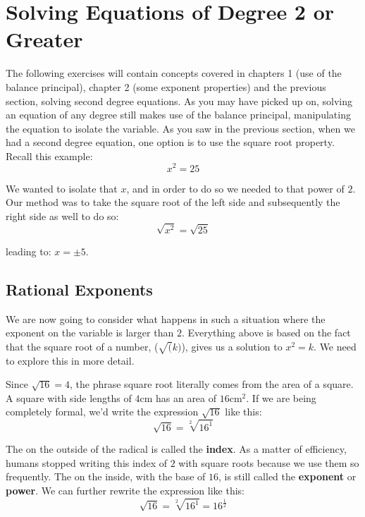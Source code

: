 %
%

\section{Solving Equations of Degree 2 or Greater}
\label{SolveHigherOrderEquations}

The following exercises will contain concepts covered in chapters 1 (use of the balance principal), chapter 2 (some exponent properties) and the previous section, solving second degree equations. As you may have picked up on, solving an equation of any degree still makes use of the balance principal, manipulating the equation to isolate the variable. As you saw in the previous section, when we had a second degree equation, one option is to use the square root property. Recall this example:
$$x^2 = 25$$

We wanted to isolate that $x$, and in order to do so we needed to  that power of $2$. Our method was to take the square root of the left side and subsequently the right side as well to do so:
$$\sqrt{x^2} = \sqrt{25}$$

leading to: $x = \pm 5$.

%
%

\subsection{Rational Exponents}

We are now going to consider what happens in such a situation where the exponent on the variable is larger than $2$.  Everything above is based on the fact that the square root of a number, ($\sqrt(k)$), gives us a solution to $x^2=k$.  We need to explore this in more detail.

Since $\sqrt{16} = 4$, the phrase square root literally comes from the area of a square.  A square with side lengths of $4$cm has an area of $16 \text{cm}^2$. If we are being completely formal, we’d write the expression $\sqrt{16}$ like this:
$$\sqrt{16}=\sqrt[2]{16^1}$$

The  on the outside of the radical is called the \textbf{index}.  As a matter of efficiency, humans stopped writing this index of $2$ with square roots because we use them so frequently. The  on the inside, with the base of $16$, is still called the \textbf{exponent} or \textbf{power}. We can further rewrite the expression like this:
$$\sqrt{16}=\sqrt[2]{16^1}=16^{\frac{1}{2}}$$

